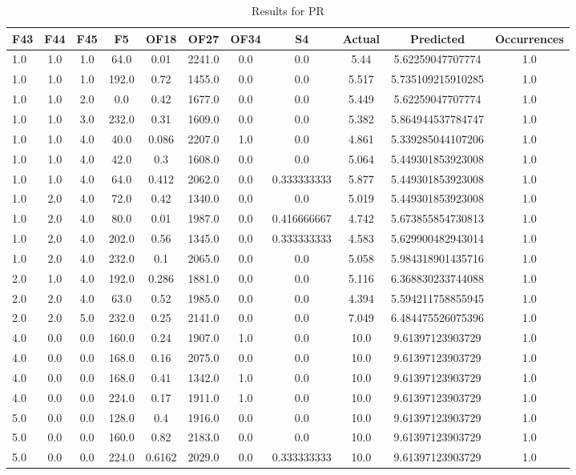 \begin{table}[htbp]
\centering
\begin{tabular}{|l|c|c|c|c|c|c|c|c|c|c|}
\hline
F43 & F44 & F45 & F5 & OF18 & OF27 & OF34 & S4 & Actual & Predicted & Occurrences \\
\hline
1.0 & 1.0 & 1.0 & 64.0 & 0.01 & 2241.0 & 0.0 & 0.0 & 5.44 & 5.62259047707774 & 1.0 \\
1.0 & 1.0 & 1.0 & 192.0 & 0.72 & 1455.0 & 0.0 & 0.0 & 5.517 & 5.735109215910285 & 1.0 \\
1.0 & 1.0 & 2.0 & 0.0 & 0.42 & 1677.0 & 0.0 & 0.0 & 5.449 & 5.62259047707774 & 1.0 \\
1.0 & 1.0 & 3.0 & 232.0 & 0.31 & 1609.0 & 0.0 & 0.0 & 5.382 & 5.864944537784747 & 1.0 \\
1.0 & 1.0 & 4.0 & 40.0 & 0.086 & 2207.0 & 1.0 & 0.0 & 4.861 & 5.339285044107206 & 1.0 \\
1.0 & 1.0 & 4.0 & 42.0 & 0.3 & 1608.0 & 0.0 & 0.0 & 5.064 & 5.449301853923008 & 1.0 \\
1.0 & 1.0 & 4.0 & 64.0 & 0.412 & 2062.0 & 0.0 & 0.333333333 & 5.877 & 5.449301853923008 & 1.0 \\
1.0 & 2.0 & 4.0 & 72.0 & 0.42 & 1340.0 & 0.0 & 0.0 & 5.019 & 5.449301853923008 & 1.0 \\
1.0 & 2.0 & 4.0 & 80.0 & 0.01 & 1987.0 & 0.0 & 0.416666667 & 4.742 & 5.673855854730813 & 1.0 \\
1.0 & 2.0 & 4.0 & 202.0 & 0.56 & 1345.0 & 0.0 & 0.333333333 & 4.583 & 5.629900482943014 & 1.0 \\
1.0 & 2.0 & 4.0 & 232.0 & 0.1 & 2065.0 & 0.0 & 0.0 & 5.058 & 5.984318901435716 & 1.0 \\
2.0 & 1.0 & 4.0 & 192.0 & 0.286 & 1881.0 & 0.0 & 0.0 & 5.116 & 6.368830233744088 & 1.0 \\
2.0 & 2.0 & 4.0 & 63.0 & 0.52 & 1985.0 & 0.0 & 0.0 & 4.394 & 5.594211758855945 & 1.0 \\
2.0 & 2.0 & 5.0 & 232.0 & 0.25 & 2141.0 & 0.0 & 0.0 & 7.049 & 6.484475526075396 & 1.0 \\
4.0 & 0.0 & 0.0 & 160.0 & 0.24 & 1907.0 & 1.0 & 0.0 & 10.0 & 9.61397123903729 & 1.0 \\
4.0 & 0.0 & 0.0 & 168.0 & 0.16 & 2075.0 & 0.0 & 0.0 & 10.0 & 9.61397123903729 & 1.0 \\
4.0 & 0.0 & 0.0 & 168.0 & 0.41 & 1342.0 & 1.0 & 0.0 & 10.0 & 9.61397123903729 & 1.0 \\
4.0 & 0.0 & 0.0 & 224.0 & 0.17 & 1911.0 & 1.0 & 0.0 & 10.0 & 9.61397123903729 & 1.0 \\
5.0 & 0.0 & 0.0 & 128.0 & 0.4 & 1916.0 & 0.0 & 0.0 & 10.0 & 9.61397123903729 & 1.0 \\
5.0 & 0.0 & 0.0 & 160.0 & 0.82 & 2183.0 & 0.0 & 0.0 & 10.0 & 9.61397123903729 & 1.0 \\
5.0 & 0.0 & 0.0 & 224.0 & 0.6162 & 2029.0 & 0.0 & 0.333333333 & 10.0 & 9.61397123903729 & 1.0 \\
\hline
\end{tabular}
\caption{Results for PR}
\label{tab:PR_results}
\end{table}
